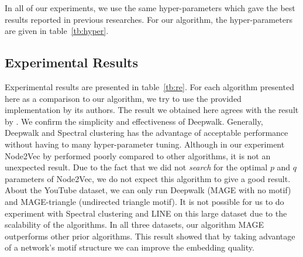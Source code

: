 \documentclass[letterpaper]{article}
\begin{document}
            In all of our experiments, we use the same hyper-parameters which gave the best 
            results reported in previous researches. For our algorithm, the hyper-parameters
            are given in table~\ref{tb:hyper}.

            \begin{table}
                \centering
                \caption{MAGE Hyper-parameters}
                \label{tb:hyper}
            \end{table}

        \subsection{Experimental Results}

            Experimental results are presented in table~\ref{tb:re}. For each algorithm
            presented here as a comparison to our algorithm, we try to use the provided implementation
            by its authors. The result we obtained here agrees with the result by \cite{deepwalk}.
            We confirm the simplicity and effectiveness of Deepwalk. Generally, Deepwalk and
            Spectral clustering has the advantage of acceptable performance without having 
            to many hyper-parameter tuning. Although in our experiment Node2Vec by \cite{node2vec} 
            performed poorly compared to other algorithms, it is not an unexpected result. Due to the
            fact that we did not \emph{search} for the optimal $p$ and $q$ parameters of Node2Vec,
            we do not expect this algorithm to give a good result. About the YouTube
            dataset, we can only run Deepwalk (MAGE with no motif) and MAGE-triangle (undirected triangle
            motif). It is not possible for us to do experiment with Spectral clustering and LINE on
            this large dataset due to the scalability of the algorithms. 
            In all three datasets, our algorithm MAGE outperforms other prior algorithms. This result
            showed that by taking advantage of a network's motif structure we can improve the embedding
            quality. 
\end{document}
